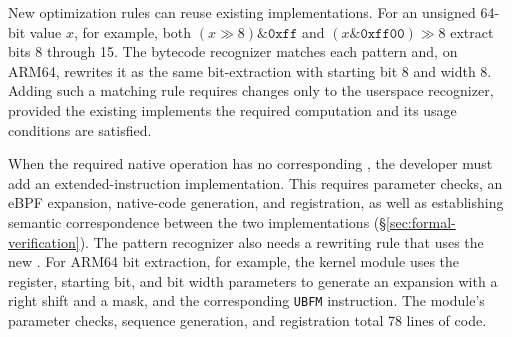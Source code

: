 

New optimization rules can reuse existing \kinsn implementations. For an unsigned 64-bit value $x$, for example, both $(x \gg 8)\mathbin{\&}\mathtt{0xff}$ and $(x\mathbin{\&}\mathtt{0xff00}) \gg 8$ extract bits 8 through 15. The bytecode recognizer matches each pattern and, on ARM64, rewrites it as the same bit-extraction \kinsn with starting bit 8 and width 8. Adding such a matching rule requires changes only to the userspace recognizer, provided the existing \kinsn implements the required computation and its usage conditions are satisfied.

When the required native operation has no corresponding \kinsn, the developer must add an extended-instruction implementation. This requires parameter checks, an eBPF expansion, native-code generation, and registration, as well as establishing semantic correspondence between the two implementations (\S\ref{sec:formal-verification}). The pattern recognizer also needs a rewriting rule that uses the new \kinsn. For ARM64 bit extraction, for example, the kernel module uses the register, starting bit, and bit width parameters to generate an expansion with a right shift and a mask, and the corresponding \texttt{UBFM} instruction. The module's parameter checks, sequence generation, and registration total 78 lines of code.